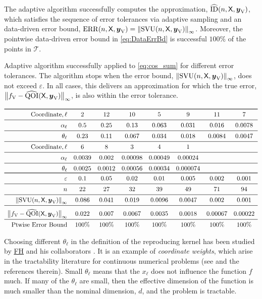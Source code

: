 \documentclass[11pt]{NSFamsart}
\newcommand{\FH}{\hyperlink{FHlink}{FH}\xspace}
\DeclareMathOperator{\QOI}{QOI} %
\DeclareMathOperator{\APP}{\widehat{\QOI}}
\DeclareMathOperator{\SVARERR}{SVU} %
\DeclareMathOperator{\ERR}{ERR}
\DeclareMathOperator{\ID}{ID}
\DeclareMathOperator{\APPID}{\widehat{\ID}}
\newcommand{\VAR}{\textup{V}}
\newcommand{\mX}{\mathsf{X}}
\newcommand{\by}{{\boldsymbol{y}}}
\newcommand{\ct}{\mathcal{T}}
\newcommand{\norm}[2][{}]{\ensuremath{\left \lVert #2 \right \rVert}_{#1}}
\newcommand{\bignorm}[2][{}]{\ensuremath{\bigl \lVert #2 \bigr \rVert}_{#1}}
\begin{document}
The adaptive algorithm successfully computes the approximation, $\APPID(n,\mX,\by_\VAR)$, which satisfies the sequence of error tolerances via adaptive sampling and an data-driven error bound, $\ERR(n,\mX,\by_\VAR) = \norm[\infty]{\SVARERR(n,\mX,\by_{\VAR})}$.  Moreover, the pointwise data-driven error bound in  \eqref{eq:DataErrBd} is successful $100\%$ of the points in $\ct$.


\begin{table}
	\caption{Adaptive algorithm successfully applied to \eqref{eq:cos_sum} for different error tolerances.  The algorithm stops when the error bound, $\norm[\infty]{\SVARERR(n,\mX,\by_{\VAR})}$, does not exceed $\varepsilon$.  In all cases, this delivers an approximation for which the true error, $\bignorm[\infty]{f_\VAR - \APP(\mX,\by_\VAR)}$, is also within the error tolerance.} \label{tab:cos_sum}

\[ 
 \begin{array}{rccccccc} 
\toprule
\text{Coordinate}, \ell & 2 & 12 & 10 & 5 & 9 & 11 & 7 \\ \midrule 
\alpha_\ell & 0.5  & 0.25  & 0.13  & 0.063  & 0.031  & 0.016  & 0.0078  \\ \midrule 
\theta_\ell & 0.23  & 0.11  & 0.067  & 0.034  & 0.018  & 0.0084  & 0.0047  \\ \midrule 
\text{Coordinate}, \ell & 6  & 8  & 3  & 4  & 1  \\ \midrule 
\alpha_\ell & 0.0039  & 0.002  & 0.00098  & 0.00049  & 0.00024  \\ \midrule 
\theta_\ell & 0.0025  & 0.0012  & 0.00056  & 0.00034  & 0.000074  \\ \toprule 
\varepsilon & 0.1 & 0.05 & 0.02 & 0.01 & 0.005 & 0.002 & 0.001 \\ \midrule 
n &  22 &  27 &  32 &  39 &  49 &  71 &  94 \\ \midrule 
\norm[\infty]{\SVARERR(n,\mX,\by_{\VAR})} & 0.086 & 0.041 & 0.019 & 0.0096 & 0.0047 & 0.002 & 0.001 \\ \midrule 
\rule[3ex]{0pt}{0pt} \bignorm[\infty]{f_\VAR - \APP(\mX,\by_\VAR)} & 0.022 & 0.007 & 0.0067 & 0.0035 & 0.0018 & 0.00067 & 0.00022 \\ \midrule 
\text{Ptwise Error Bound} & 100\% & 100\% & 100\% & 100\% & 100\% & 100\% & 100\% 
\end{array} 
 \]
\end{table}

Choosing different $\theta_\ell$ in the definition of the reproducing kernel has been studied by \FH and his collaborators \cite{FasHicWoz12a, FasHicWoz12b}.  It is an example of \emph{coordinate weights}, which arise in the tractability literature for continuous numerical problems (see \cite{DicEtal14a,NovWoz08a, NovWoz10a, NovWoz12a} and the references therein).  Small $\theta_\ell$ means that the $x_\ell$ does not influence the function $f$ much.  If many of the $\theta_\ell$ are small, then the effective dimension of the function is much smaller than the nominal dimension, $d$, and the problem is tractable. 
\end{document}
